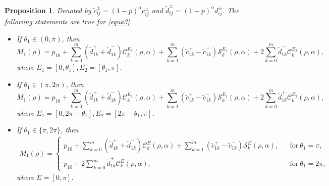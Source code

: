 \documentclass[11pt]{amsart}
\newtheorem{prop}[thm]{Proposition}
\theoremstyle{remark}
\theoremstyle{definition}
\begin{document}
\begin{prop} \label{prop1}Denoted by  $\tilde{c}_{ij}^{\pm}=(1-p)^{\alpha}c_{ij}^{\pm}$ and  $\tilde{d}_{ij}^{\pm}=(1-p)^{\alpha}d_{ij}^{\pm}$.
The following statements are true for \eqref{equa3}.
\begin{itemize}

\item[(i)] If $\theta_1\in(0,\pi)$,  then
\begin{equation*}\label{equa7-1}
M_{1}(\rho)=p_{10}+\sum_{k=0}^{m}\left(\tilde{d}_{1k}^{+}+\tilde{d}_{1k}^{-}\right)\mathcal{C}_{k}^{E_1}(\rho,\alpha)
+\sum_{k=1}^{m}\left(\tilde{c}_{1k}^{+}-\tilde{c}_{1k}^{-}\right)\mathcal{S}_{k}^{E_1}(\rho,\alpha)
+2\sum_{k=0}^{m}\tilde{d}_{1k}^-\mathcal{C}_{k}^{E_2}(\rho,\alpha),
\end{equation*}
where $E_1=[0,\theta_1], E_2=[\theta_1, \pi]$.


\item[(ii)] If   $\theta_1\in(\pi, 2\pi)$,  then
\begin{equation*}\label{equa8}
M_{1}(\rho)=p_{10}+\sum_{k=0}^{m}\left(\tilde{d}_{1k}^{+}+\tilde{d}_{1k}^{-}\right)\mathcal{C}_{k}^{E_1}(\rho,\alpha)
+\sum_{k=1}^{m}\left(\tilde{c}_{1k}^{+}-\tilde{c}_{1k}^{-}\right)\mathcal{S}_{k}^{E_1}(\rho,\alpha)
+2\sum_{k=0}^{m}\tilde{d}_{1k}^+\mathcal{C}_{k}^{E_2}(\rho,\alpha),
\end{equation*}
where $E_1=[0,2\pi-\theta_1], E_2=[2\pi-\theta_1, \pi]$.

\item[(iii)]  If  $\theta_1\in \{\pi, 2\pi\}$, then
 \begin{align*}\label{equa1-40}
M_{1}(\rho)=
\left\{
\begin{aligned}
  p_{10}+\sum_{k=0}^{m}\left(\tilde{d}_{1k}^{+}+\tilde{d}_{1k}^{-}\right)\mathcal{C}_{k}^{E}(\rho,\alpha)
+\sum_{k=1}^{m}\left(\tilde{c}_{1k}^{+}-\tilde{c}_{1k}^{-}\right)\mathcal{S}_{k}^{E}(\rho,\alpha),&& \mbox{for} \ \theta_1=\pi,  \\
 p_{10}+2\sum_{k=0}^{m}\tilde{d}_{1k}^{+}\mathcal{C}_{k}^{E}(\rho,\alpha),\quad \quad\quad\quad\quad\quad\quad\quad\quad\quad
  \quad\quad&&  \mbox{for} \ \theta_1=2\pi,
\end{aligned}
\right.
\end{align*}
where $E=[0, \pi]$.
\end{itemize}


\end{prop}
\end{document}
